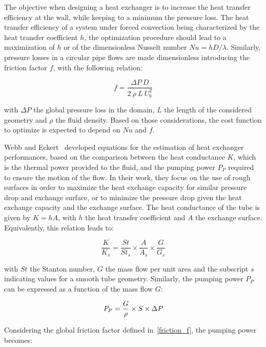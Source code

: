 The objective when designing a heat exchanger is to increase the heat transfer efficiency at the wall, while keeping to a minimum the pressure loss. The heat transfer efficiency of a system under forced convection being characterized by the heat transfer coefficient $h$, the optimization procedure should lead to a maximization of $h$ or of the dimensionless Nusselt number $Nu = hD/\lambda$. Similarly, pressure losses in a circular pipe flows are made dimensionless introducing the friction factor $f$, with the following relation:

\begin{equation}
f = \frac{\Delta P ~ D}{2 ~ \rho ~ L ~ U_b^2}
\label{friction_f}
\end{equation}

\noindent with $\Delta P$ the global pressure loss in the domain, $L$ the length of the considered geometry and $\rho$ the fluid density. Based on those considerations, the cost function to optimize is expected to depend on $Nu$ and $f$.

Webb and Eckert~\cite{webb1972} developed equations for the estimation of heat exchanger performances, based on the comparison between the heat conductance $K$, which is the thermal power provided to the fluid, and the pumping power $P_{P}$ required to ensure the motion of the flow. In their work, they focus on the use of rough surfaces in order to maximize the heat exchange capacity for similar pressure drop and exchange surface, or to minimize the pressure drop given the heat exchange capacity and the exchange surface. The heat conductance of the tube is given by $K=hA$, with $h$ the heat transfer coefficient and $A$ the exchange surface. Equivalently, this relation leads to:

\begin{equation}
\frac{K}{K_s} = \frac{St}{St_s} \times \frac{A}{A_s} \times \frac{G}{G_s}
\label{heat_conduct}
\end{equation}

\noindent with $St$ the Stanton number, $G$ the mass flow per unit area and the subscript $s$ indicating values for a smooth tube geometry. Similarly, the pumping power $P_{P}$ can be expressed as a function of the mass flow $G$:

\begin{equation}
P_{P} = \frac{G}{\rho} \times S \times \Delta P\\
\label{pump_pow}
\end{equation}

Considering the global friction factor defined in~\cref{friction_f}, the pumping power becomes:

